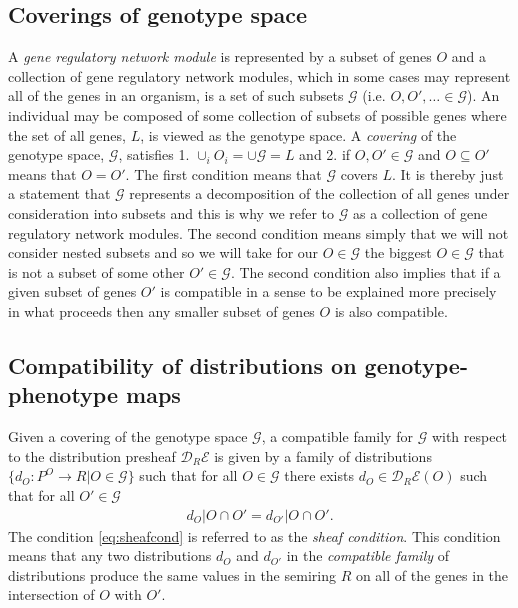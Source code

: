 \subsection*{Coverings of genotype space}
A \emph{gene regulatory network module} is represented by a subset of genes $O$ and a collection of gene regulatory network modules, which in some cases may represent all of the genes in an organism, is a set of such subsets $\mathcal{G}$ (i.e. $O,O',\ldots \in \mathcal{G}$). An individual may be composed of some collection of subsets of possible genes where the set of all genes, $L$, is viewed as the genotype space. A \emph{covering} of the genotype space, $\mathcal{G}$, satisfies 1. $\cup_i O_i = \cup \mathcal{G} = L$ and 2. if $O,O' \in \mathcal{G}$ and $O \subseteq O'$ means that $O = O'$. The first condition means that $\mathcal{G}$ covers $L$. It is thereby just a statement that $\mathcal{G}$ represents a decomposition of the collection of all genes under consideration into subsets and this is why we refer to $\mathcal{G}$ as a collection of gene regulatory network modules. The second condition means simply that we will not consider nested subsets and so we will take for our $O \in \mathcal{G}$ the biggest $O \in \mathcal{G}$ that is not a subset of some other $O' \in \mathcal{G}$. The second condition also implies that if a given subset of genes $O'$ is compatible in a sense to be explained more precisely in what proceeds then any smaller subset of genes $O$ is also compatible.

\subsection*{Compatibility of distributions on genotype-phenotype maps}
Given a covering of the genotype space $\mathcal{G}$, a compatible family for $\mathcal{G}$ with respect to the distribution presheaf $\mathcal{D}_R\mathcal{E}$ is given by a family of distributions $\{d_O \colon P^O \rightarrow R | O \in \mathcal{G}\}$ such that for all $O \in \mathcal{G}$ there exists $d_O \in \mathcal{D}_R\mathcal{E}(O)$ such that for all $O' \in \mathcal{G}$
\begin{eqnarray}\label{eq:sheafcond}
d_O|O \cap O' = d_{O'}|O \cap O'.
\end{eqnarray}
The condition \ref{eq:sheafcond} is referred to as the \emph{sheaf condition}. This condition means that any two distributions $d_O$ and $d_{O'}$ in the \emph{compatible family} of distributions produce the same values in the semiring $R$ on all of the genes in the intersection of $O$ with $O'$.

